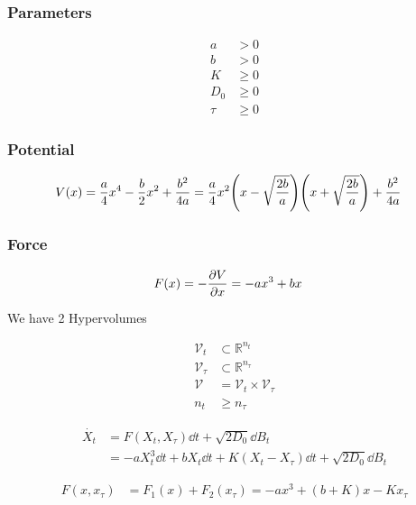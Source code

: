 \documentclass[a4paper,10pt]{article}
\begin{document}
\subsubsection*{Parameters}

\begin{align}
	a&>0
\\
	b&>0
\\
	K&\geq 0
\\
	D_0
	&\geq 0
\\
	\tau
	&\geq 0
\end{align}

\subsubsection*{Potential}

\begin{align}
	V(x)
	&=
	\frac{a}{4}
	x^4
	-
	\frac{b}{2}
	x^2
	+
	\frac{b^2}{4a}
	=
	\frac{a}{4}
	x^2
	\pqty{
		x-\sqrt{\frac{2b}{a}}
	}
	\pqty{
		x+\sqrt{\frac{2b}{a}}	
	}
	+
	\frac{b^2}{4a}
\end{align}

\subsubsection*{Force}

\begin{align}
	F(x)
	&=
	-\pdv{V}{x}
	=
	-
	a
	x^3
	+
	b
	x
\end{align}


We have 2 Hypervolumes

\begin{align}
	\mathcal{V}_t
	&\subset
	\mathbb{R}^{n_t}
\\
	\mathcal{V}_\tau
	&\subset
	\mathbb{R}^{n_\tau}
\\
	\mathcal{V}
	&=
	\mathcal{V}_t
	\times
	\mathcal{V}_\tau
\\
	n_t
	&\geq
	n_\tau
\end{align}


\begin{align}
	\dot{X_t}
	&=
	F(X_t,X_\tau)
	\dd{t}
	+
	\sqrt{2D_0}
	\dd{B}_t
\\	
	&=
	-
	a
	X_t^3
	\dd{t}
	+
	b
	X_t
	\dd{t}
	+
	K
	(X_t-X_\tau)
	\dd{t}
	+
	\sqrt{2D_0}
	\dd{B}_t
\end{align}

\begin{align}
	F(x,x_\tau)
	&=
	F_1(x)
	+
	F_2(x_\tau)
	=
	-
	ax^3
	+
	(b+K)x
	-
	Kx_\tau
\end{align}
\end{document}
